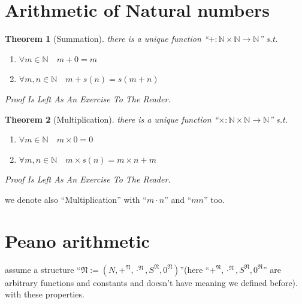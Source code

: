 \documentclass[10pt,a4paper]{book}
\newtheorem{theorem}{Theorem}[section]
\begin{document}
\section{Arithmetic of Natural numbers}

\begin{theorem}[Summation] there is a unique function ``$+ :\mathbb{N} \times \mathbb{N} \to \mathbb{N}$'' s.t.

    \begin{enumerate}
        \setlength{\itemsep}{0pt} %
        \item       $\forall m \in \mathbb{N} \quad m+0 = m$
        \item       $\forall m,n \in \mathbb{N} \quad m+s(n) = s(m +n)  $
    \end{enumerate}
    Proof Is Left As An Exercise To The Reader.
\end{theorem}

\begin{theorem}[Multiplication] there is a unique function ``$\times :\mathbb{N} \times \mathbb{N} \to \mathbb{N}$'' s.t.

    \begin{enumerate}
        \setlength{\itemsep}{0pt} %
        \item       $\forall m \in \mathbb{N} \quad m \times 0 = 0$
        \item       $\forall m,n \in \mathbb{N} \quad m \times s(n) = m \times n+ m   $
    \end{enumerate}
    Proof Is Left As An Exercise To The Reader.
\end{theorem}
we denote also ``Multiplication'' with ``$m \cdot n$'' and ``$mn$'' too.

\section{Peano arithmetic}



assume a structure ``$\mathfrak{N} := (N , +^{\mathfrak{N}} , \cdot^{\mathfrak{N}} , S^{\mathfrak{N}} , 0^{\mathfrak{N}})$''(here ``$+^{\mathfrak{N}} ,
    \cdot^{\mathfrak{N}} , S^{\mathfrak{N}} , 0^{\mathfrak{N}} $'' are arbitrary functions and constants and doesn't have
meaning we defined before). with these properties.
\end{document}
